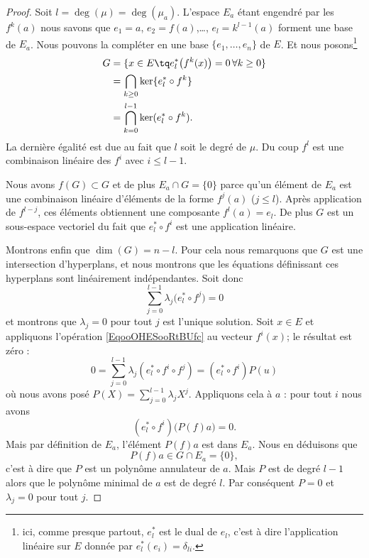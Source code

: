 \begin{proof}
    Soit \( l=\deg(\mu)=\deg(\mu_a)\). L'espace \( E_a\) étant engendré par les \( f^k(a)\) nous savons que \( e_1=a\), \( e_2=f(a)\),\ldots, \( e_l=k^{l-1}(a)\) forment une base de \( E_a\). Nous pouvons la compléter en une base \( \{ e_1,\ldots, e_n \}\) de \( E\). Et nous posons\footnote{ici, comme presque partout, \( e^*_{l}\) est le dual de \( e_l\), c'est à dire l'application linéaire sur \( E\) donnée par \( e^*_l(e_i)=\delta_{li}\). }
    \begin{subequations}
        \begin{align}
            G&=\{ x\in E\tq e^*_l\big( f^k(x) \big)=0\,\forall k\geq 0 \}\\
            &=\bigcap_{k\geq 0}\ker\{ e^*_l\circ f^k \}\\
            &=\bigcap_{k=0}^{l-1}\ker(  e^*_l\circ f^k ).
        \end{align}
    \end{subequations}
    La dernière égalité est due au fait que \( l\) soit le degré de \( \mu\). Du coup \( f^l\) est une combinaison linéaire des \( f^i\) avec \( i\leq l-1\).

    Nous avons \( f(G)\subset G\) et de plus \( E_a\cap G=\{ 0 \}\) parce qu'un élément de \( E_a\) est une combinaison linéaire d'éléments de la forme \( f^j(a)\) (\( j\leq l\)). Après application de \( f^{l-j}\), ces éléments obtiennent une composante \( f^l(a)=e_l\). De plus \( G\) est un sous-espace vectoriel du fait que \( e^*_l\circ f^i\) est une application linéaire.

    Montrons enfin que \( \dim(G)=n-l\). Pour cela nous remarquons que \( G\) est une intersection d'hyperplans, et nous montrons que les équations définissant ces hyperplans sont linéairement indépendantes. Soit donc
    \begin{equation}        \label{EqooOHESooRtBUfc}
        \sum_{j=0}^{l-1}\lambda_j\big( e^*_l\circ f^j \big)=0
    \end{equation}
    et montrons que \( \lambda_j=0\) pour tout $j$ est l'unique solution. Soit \( x\in E\) et appliquons l'opération \eqref{EqooOHESooRtBUfc} au vecteur \( f^i(x)\); le résultat est zéro :
    \begin{equation}
        0=\sum_{j=0}^{l-1}\lambda_j(e^*_l\circ f^i\circ f^j)=(e^*_l\circ f^i)P(u)
    \end{equation}
    où nous avons posé \( P(X)=\sum_{j=0}^{l-1}\lambda_jX^j\). Appliquons cela à \( a\) : pour tout \( i\) nous avons
    \begin{equation}
        (e^*_l\circ f^i)\big( P(f)a \big)=0.
    \end{equation}
    Mais par définition de \( E_a\), l'élément \(P(f)a \) est dans \( E_a\). Nous en déduisons que
    \begin{equation}
        P(f)a\in G\cap E_a=\{ 0 \},
    \end{equation}
    c'est à dire que \( P\) est un polynôme annulateur de \( a\). Mais \( P\) est de degré \( l-1\) alors que le polynôme minimal de \( a\) est de degré \( l\). Par conséquent \( P=0\) et \( \lambda_j=0\) pour tout \( j\).
\end{proof}

